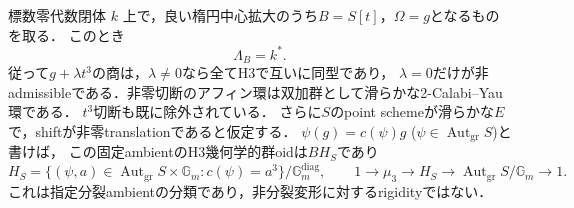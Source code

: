 \begin{theorem}[分裂中心拡大の全切断と双加群滑らかさ]
\label{thm:r13-split-all-cuts}
標数零代数閉体 $k$ 上で，良い楕円中心拡大のうち$B=S[t]$，$\Omega=g$となるものを取る．
このとき
\[
 \Lambda_B=k^*.
\]
従って$g+\lambda t^3$の商は，$\lambda\ne0$なら全てH3で互いに同型であり，
$\lambda=0$だけが非admissibleである．非零切断のアフィン環は双加群として滑らかな2-Calabi--Yau環である．
$t^3$切断も既に除外されている．
さらに$S$のpoint schemeが滑らかな$E$で，shiftが非零translationであると仮定する．
$\psi(g)=c(\psi)g$ ($\psi\in\operatorname{Aut}_{\mathrm{gr}}S$)と書けば，
この固定ambientのH3幾何学的群oidは$BH_S$であり
\[
 H_S=\{(\psi,a)\in\operatorname{Aut}_{\mathrm{gr}}S\times\mathbb G_m:
                      c(\psi)=a^3\}/\mathbb G_m^{\mathrm{diag}},
 \qquad
 1\longrightarrow\mu_3\longrightarrow H_S
 \longrightarrow\operatorname{Aut}_{\mathrm{gr}}S/\mathbb G_m\longrightarrow1.
\]
これは指定分裂ambientの分類であり，非分裂変形に対するrigidityではない．
\end{theorem}
